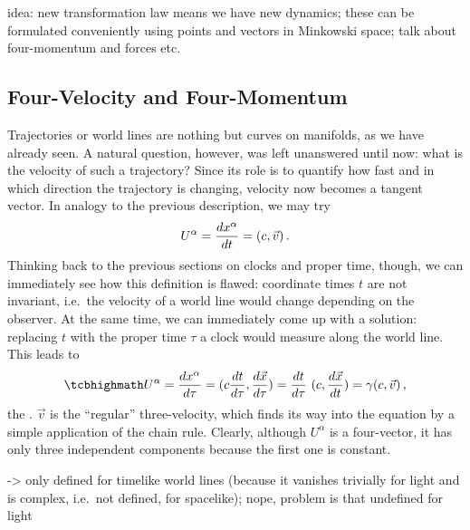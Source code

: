 idea: new transformation law means we have new dynamics; these can be formulated conveniently using points and vectors in Minkowski space; talk about four-momentum and forces etc.





		\subsection{Four-Velocity and Four-Momentum}
Trajectories or world lines are nothing but curves on manifolds, as we have already seen. A natural question, however, was left unanswered until now: what is the velocity of such a trajectory? Since its role is to quantify how fast and in which direction the trajectory is changing, velocity now becomes a tangent vector. In analogy to the previous description, we may try
\begin{equation}
	U^\alpha = \dv{x^\alpha}{t} = (c, \vec{v}) \, .
\end{equation}
Thinking back to the previous sections on clocks and proper time, though, we can immediately see how this definition is flawed: coordinate times $t$ are not invariant, i.e.~the velocity of a world line would change depending on the observer. At the same time, we can immediately come up with a solution: replacing $t$ with the proper time $\tau$ a clock would measure along the world line. This leads to
\begin{equation}\label{eq:four_velocity}
	\eqbox{
	U^\alpha = \dv{x^\alpha}{\tau} = (c \dv{t}{\tau}, \dv{\vec{x}}{\tau}) = \dv{t}{\tau}~ (c, \dv{\vec{x}}{t}) = \gamma (c, \vec{v})
	} \, ,
\end{equation}
the . $\vec{v}$ is the \enquote{regular} three-velocity, which finds its way into the equation by a simple application of the chain rule. Clearly, although $U^\alpha$ is a four-vector, it has only three independent components because the first one is constant.



-> only defined for timelike world lines (because it vanishes trivially for light and is complex, i.e.~not defined, for spacelike); nope, problem is that undefined for light


